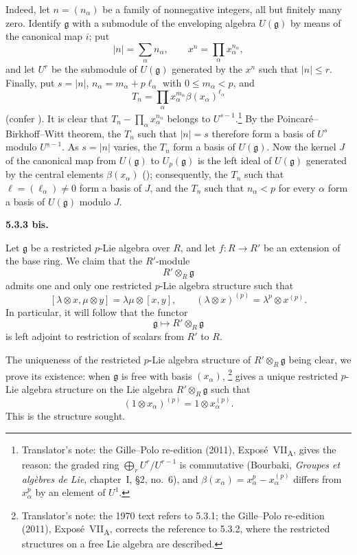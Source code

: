 Indeed, let \(n=(n_\alpha)\) be a family of nonnegative integers,
all but finitely many zero. Identify \(\mathfrak g\) with a submodule of
the enveloping algebra \(U(\mathfrak g)\) by means of the canonical map
\(i\); put
\[
  |n|=\sum_\alpha n_\alpha,
  \qquad
  x^n=\prod_\alpha x_\alpha^{n_\alpha},
\]
and let \(U^r\) be the submodule of \(U(\mathfrak g)\) generated by the
\(x^n\) such that \(|n|\le r\). Finally, put \(s=|n|\),
\(n_\alpha=m_\alpha+p\ell_\alpha\) with \(0\le m_\alpha<p\), and
\[
  T_n
  =
  \prod_\alpha
  x_\alpha^{m_\alpha}
  \beta(x_\alpha)^{\ell_\alpha}
\]
(confer ). It is clear that
\(T_n-\prod_\alpha x_\alpha^{n_\alpha}\) belongs to
\(U^{s-1}\).\footnote{Translator's note: the Gille--Polo re-edition
(2011), Expos\'e~VII\textsubscript{A}, gives the reason: the graded
ring \(\bigoplus_rU^r/U^{r-1}\) is commutative (Bourbaki,
\emph{Groupes et alg\`ebres de Lie}, chapter~I, \S2, no.~6), and
\(\beta(x_\alpha)=x_\alpha^p-x_\alpha^{(p)}\) differs from
\(x_\alpha^p\) by an element of \(U^1\).} By the
Poincar\'e--Birkhoff--Witt theorem, the \(T_n\) such that \(|n|=s\)
therefore form a basis of \(U^s\) modulo \(U^{s-1}\). As \(s=|n|\)
varies, the \(T_n\) form a basis of \(U(\mathfrak g)\). Now the kernel
\(J\) of the canonical map from \(U(\mathfrak g)\) to
\(U_p(\mathfrak g)\) is the left ideal of \(U(\mathfrak g)\) generated
by the central elements \(\beta(x_\alpha)\) (); consequently, the
\(T_n\) such that \(\ell=(\ell_\alpha)\ne0\) form a basis of \(J\), and
the \(T_n\) such that \(n_\alpha<p\) for every \(\alpha\) form a basis of
\(U(\mathfrak g)\) modulo \(J\).

\medskip
\noindent\textbf{5.3.3 bis.}
\label{sga3:VIIA:5.3.3bis}

Let \(\mathfrak g\) be a restricted \(p\)-Lie algebra over \(R\),
and let \(f:R\to R'\) be an extension of the base ring. We claim
that the \(R'\)-module
\[
  R'\otimes_R\mathfrak g
\]
admits one and only one restricted \(p\)-Lie algebra structure
such that
\[
  [\lambda\otimes x,\mu\otimes y]
  =
  \lambda\mu\otimes[x,y],
  \qquad
  (\lambda\otimes x)^{(p)}
  =
  \lambda^p\otimes x^{(p)}.
\]
In particular, it will follow that the functor
\[
  \mathfrak g\longmapsto R'\otimes_R\mathfrak g
\]
is left adjoint to restriction of scalars from \(R'\) to \(R\).

The uniqueness of the restricted \(p\)-Lie algebra structure of
\(R'\otimes_R\mathfrak g\) being clear, we prove its existence: when
\(\mathfrak g\) is free with basis \((x_\alpha)\), \footnote{Translator's note: the 1970 text refers to 5.3.1; the
Gille--Polo re-edition (2011), Expos\'e~VII\textsubscript{A}, corrects
the reference to 5.3.2, where the restricted structures on a free Lie
algebra are described.} gives a unique restricted
\(p\)-Lie algebra structure on the Lie algebra
\(R'\otimes_R\mathfrak g\) such that
\[
  (1\otimes x_\alpha)^{(p)}
  =
  1\otimes x_\alpha^{(p)}.
\]
This is the structure sought.

